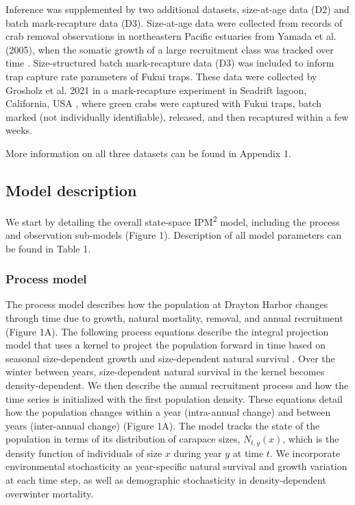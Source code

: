 \documentclass{article}
\begin{document}
Inference was supplemented by two additional datasets, size-at-age data (D2) and batch mark-recapture data (D3). Size-at-age data were collected from records of crab removal observations in northeastern Pacific estuaries from Yamada et al. (2005), when the somatic growth of a large recruitment class was tracked over time \parencite{yamada2005growth}. Size-structured batch mark-recapture data (D3) was included to inform trap capture rate parameters of Fukui traps. These data were collected by Grosholz et al. 2021 in a mark-recapture experiment in Seadrift lagoon, California, USA \parencite{grosholz2021stage}, where green crabs were captured with Fukui traps, batch marked (not individually identifiable), released, and then recaptured within a few weeks. 

More information on all three datasets can be found in Appendix 1. 

\subsection{Model description}

We start by detailing the overall state-space IPM\textsuperscript{2} model, including the process and observation sub-models (Figure 1). Description of all model parameters can be found in Table 1.

\subsubsection{Process model}

The process model describes how the population at Drayton Harbor changes through time due to growth, natural mortality, removal, and annual recruitment (Figure 1A). The following process equations describe the integral projection model that uses a kernel to project the population forward in time based on seasonal size-dependent growth and size-dependent natural survival \parencite{rees2014building}. Over the winter between years, size-dependent natural survival in the kernel becomes density-dependent. We then describe the annual recruitment process and how the time series is initialized with the first population density. These equations detail how the population changes within a year (intra-annual change) and between years (inter-annual change) (Figure 1A). The model tracks the state of the population in terms of its distribution of carapace sizes, $N_{t, y}(x)$, which is the density function of individuals of size $x$ during year $y$ at time $t$. We incorporate environmental stochasticity as year-specific natural survival and growth variation at each time step, as well as demographic stochasticity in density-dependent overwinter mortality.
\end{document}
